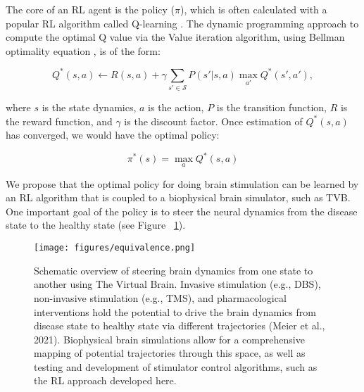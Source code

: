 \documentclass[12pt, a4paper]{article}
\begin{document}
The core of an RL agent is the policy ($\pi$), which is often calculated with a popular RL algorithm called Q-learning \parencite{watkinsQlearning1992}. The dynamic programming approach to compute the optimal Q value via the Value iteration algorithm, using Bellman optimality equation \parencite{busoniuReinforcementLearningControl2018}, is of the form:

\begin{equation*}
Q^{*}({s},{a}) \leftarrow {R}({s},{a}) +\gamma \sum_{{s'}\in {\mathcal{S}}}
P({s'}|{s},{a}) \max_{{a'}} {Q^{*}({s'},{a'})},
\end{equation*}

\noindent where $s$ is the state dynamics, $a$ is the action, $P$ is the transition function, $R$ is the reward function, and $\gamma$ is the discount factor. Once estimation of $Q^{*}({s},{a})$ has converged, we would have the optimal policy:


\begin{equation*}
\pi^{*}(s) = \max_{{a}} {Q^{*}({s},{a})}
\end{equation*}

\indent We propose that the optimal policy for doing brain stimulation can be learned by an RL algorithm that is coupled to a biophysical brain simulator, such as TVB. One important goal of the policy is to steer the neural dynamics from the disease state to the healthy state (see Figure ~\ref{fig:equivalence}).


\begin{figure}[htpb!] %
	\centering %
	\texttt{[image: figures/equivalence.png]} %
	\caption{Schematic overview of steering brain dynamics from one state to another using The Virtual Brain. Invasive stimulation (e.g., DBS), non-invasive stimulation (e.g., TMS), and pharmacological interventions hold the potential to drive the brain dynamics from disease state to healthy state via different trajectories (Meier et al., 2021). Biophysical brain simulations allow for a comprehensive mapping of potential trajectories through this space, as well as testing and development of stimulator control algorithms, such as the RL approach developed here.} %
	\label{fig:equivalence} %
\end{figure}
\end{document}
